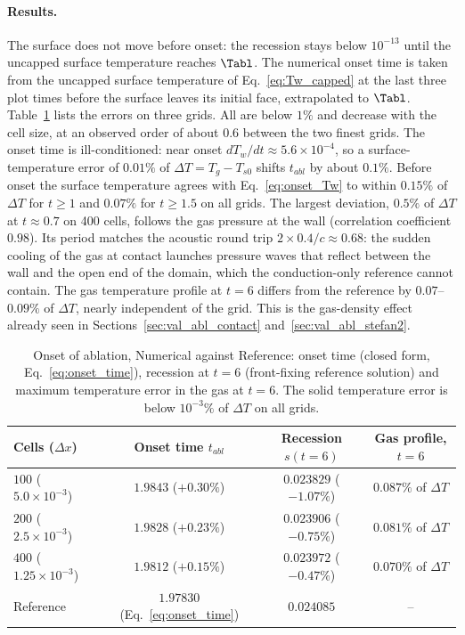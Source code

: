 \paragraph{Results.}
The surface does not move before onset: the recession stays below $10^{-13}$ until the uncapped surface temperature reaches $\Tabl$. The numerical onset time is taken from the uncapped surface temperature of Eq.~\ref{eq:Tw_capped} at the last three plot times before the surface leaves its initial face, extrapolated to $\Tabl$. Table~\ref{tab:val_abl_onset} lists the errors on three grids. All are below $1\%$ and decrease with the cell size, at an observed order of about $0.6$ between the two finest grids. The onset time is ill-conditioned: near onset $dT_w/dt \approx 5.6\times10^{-4}$, so a surface-temperature error of $0.01\%$ of $\Delta T = T_g - T_{s0}$ shifts $t_{abl}$ by about $0.1\%$. Before onset the surface temperature agrees with Eq.~\ref{eq:onset_Tw} to within $0.15\%$ of $\Delta T$ for $t \geq 1$ and $0.07\%$ for $t \geq 1.5$ on all grids. The largest deviation, $0.5\%$ of $\Delta T$ at $t \approx 0.7$ on 400 cells, follows the gas pressure at the wall (correlation coefficient $0.98$). Its period matches the acoustic round trip $2 \times 0.4/c \approx 0.68$: the sudden cooling of the gas at contact launches pressure waves that reflect between the wall and the open end of the domain, which the conduction-only reference cannot contain. The gas temperature profile at $t = 6$ differs from the reference by $0.07$--$0.09\%$ of $\Delta T$, nearly independent of the grid. This is the gas-density effect already seen in Sections~\ref{sec:val_abl_contact} and~\ref{sec:val_abl_stefan2}.

\begin{table}[H]
    \centering
    \begin{tabular}{lccc}
        \toprule
        Cells ($\Delta x$) & Onset time $t_{abl}$ & Recession $s(t = 6)$ & Gas profile, $t = 6$ \\
        \midrule
        $100$ ($5.0\times10^{-3}$)  & $1.9843$ ($+0.30\%$) & $0.023829$ ($-1.07\%$) & $0.087\%$ of $\Delta T$ \\
        $200$ ($2.5\times10^{-3}$)  & $1.9828$ ($+0.23\%$) & $0.023906$ ($-0.75\%$) & $0.081\%$ of $\Delta T$ \\
        $400$ ($1.25\times10^{-3}$) & $1.9812$ ($+0.15\%$) & $0.023972$ ($-0.47\%$) & $0.070\%$ of $\Delta T$ \\
        \midrule
        Reference & $1.97830$ (Eq.~\ref{eq:onset_time}) & $0.024085$ & -- \\
        \bottomrule
    \end{tabular}
    \caption{Onset of ablation, Numerical against Reference: onset time (closed form, Eq.~\ref{eq:onset_time}), recession at $t = 6$ (front-fixing reference solution) and maximum temperature error in the gas at $t = 6$. The solid temperature error is below $10^{-3}\%$ of $\Delta T$ on all grids.}
    \label{tab:val_abl_onset}
\end{table}

